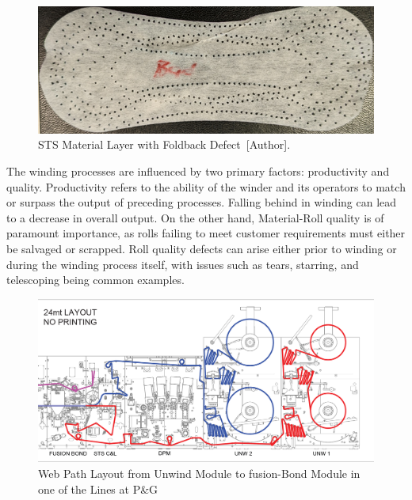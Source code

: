 \begin{figure}[H]
    \centering
    \includegraphics[width=0.6\linewidth]{FIGURES/defect1.png}
    \caption{STS Material Layer with Foldback Defect~[Author].}
    \label{defect1}
\end{figure}

The winding processes are influenced by two primary factors: productivity and quality. Productivity refers to the ability of the winder and its operators to match or surpass the output of preceding processes. Falling behind in winding can lead to a decrease in overall output. On the other hand, Material-Roll quality is of paramount importance, as rolls failing to meet customer requirements must either be salvaged or scrapped. Roll quality defects can arise either prior to winding or during the winding process itself, with issues such as tears, starring, and telescoping being common examples. 

\begin{figure}[H]
    \centering
    \includegraphics[scale = 0.3]{FIGURES/layout.png}
    \caption{Web Path Layout from Unwind Module to fusion-Bond Module in one of the Lines at P\&G~\cite{layout}}
    \label{layout}
\end{figure}


